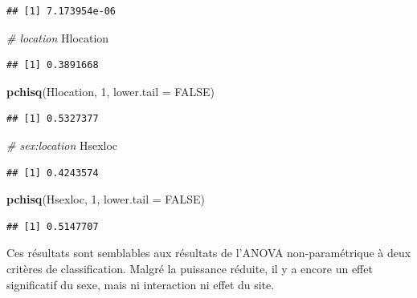 \documentclass[
  12pt,
]{book}
\newenvironment{Shaded}{\begin{snugshade}}{\end{snugshade}}
\newcommand{\CommentTok}[1]{\textcolor[rgb]{0.56,0.35,0.01}{\textit{#1}}}
\newcommand{\DataTypeTok}[1]{\textcolor[rgb]{0.13,0.29,0.53}{#1}}
\newcommand{\DecValTok}[1]{\textcolor[rgb]{0.00,0.00,0.81}{#1}}
\newcommand{\KeywordTok}[1]{\textcolor[rgb]{0.13,0.29,0.53}{\textbf{#1}}}
\newcommand{\NormalTok}[1]{#1}
\newcommand{\OtherTok}[1]{\textcolor[rgb]{0.56,0.35,0.01}{#1}}
\begin{document}
\begin{verbatim}
## [1] 7.173954e-06
\end{verbatim}

\begin{Shaded}
\begin{Highlighting}[]
\CommentTok{\# location}
\NormalTok{Hlocation}
\end{Highlighting}
\end{Shaded}

\begin{verbatim}
## [1] 0.3891668
\end{verbatim}

\begin{Shaded}
\begin{Highlighting}[]
\KeywordTok{pchisq}\NormalTok{(Hlocation, }\DecValTok{1}\NormalTok{, }\DataTypeTok{lower.tail =} \OtherTok{FALSE}\NormalTok{)}
\end{Highlighting}
\end{Shaded}

\begin{verbatim}
## [1] 0.5327377
\end{verbatim}

\begin{Shaded}
\begin{Highlighting}[]
\CommentTok{\# sex:location}
\NormalTok{Hsexloc}
\end{Highlighting}
\end{Shaded}

\begin{verbatim}
## [1] 0.4243574
\end{verbatim}

\begin{Shaded}
\begin{Highlighting}[]
\KeywordTok{pchisq}\NormalTok{(Hsexloc, }\DecValTok{1}\NormalTok{, }\DataTypeTok{lower.tail =} \OtherTok{FALSE}\NormalTok{)}
\end{Highlighting}
\end{Shaded}

\begin{verbatim}
## [1] 0.5147707
\end{verbatim}

Ces résultats sont semblables aux résultats de l'ANOVA non-paramétrique à deux critères de classification. Malgré la puissance réduite, il y a encore un effet significatif du sexe, mais ni interaction ni effet du site.
\end{document}
